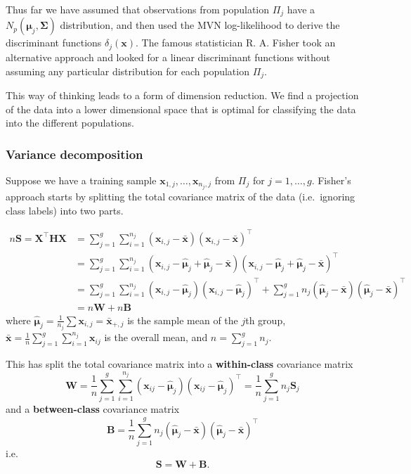 \documentclass[
]{book}
\theoremstyle{definition}
\theoremstyle{definition}
\theoremstyle{definition}
\theoremstyle{definition}
\theoremstyle{remark}
\begin{document}
Thus far we have assumed that observations from population \(\Pi_j\) have a \(N_p ( \boldsymbol{\mu}_j, {\mathbf \Sigma})\) distribution, and then used the MVN log-likelihood to derive the discriminant functions \(\delta_j(\mathbf x)\). The famous statistician R. A. Fisher took an alternative approach and looked for a linear discriminant functions without assuming any particular distribution for each population \(\Pi_j\).

This way of thinking leads to a form of dimension reduction. We find a projection of the data into a lower dimensional space that is optimal for classifying the data into the different populations.

\subsubsection*{Variance decomposition}\label{variance-decomposition}

Suppose we have a training sample \(\mathbf x_{1,j}, \ldots, \mathbf x_{n_j,j}\) from \(\Pi_j\) for \(j=1,\ldots,g\).
Fisher's approach starts by splitting the total covariance matrix of the data (i.e.~ignoring class labels) into two parts.

\begin{align*}
n\mathbf S=\mathbf X^\top\mathbf H\mathbf X&= \sum_{j=1}^g\sum_{i=1}^{n_j} (\mathbf x_{i,j} - \bar{\mathbf x})(\mathbf x_{i,j} - \bar{\mathbf x})^\top\\
&=\sum_{j=1}^g\sum_{i=1}^{n_j} (\mathbf x_{i,j} - \hat{{\boldsymbol{\mu}}}_j+\hat{{\boldsymbol{\mu}}}_j-\bar{\mathbf x})(\mathbf x_{i,j} - \hat{{\boldsymbol{\mu}}}_j+\hat{{\boldsymbol{\mu}}}_j-\bar{\mathbf x})^\top\\
&= \sum_{j=1}^g\sum_{i=1}^{n_j} (\mathbf x_{i,j} - \hat{{\boldsymbol{\mu}}}_j)(\mathbf x_{i,j} - \hat{{\boldsymbol{\mu}}}_j)^\top+
\sum_{j=1}^g n_j (\hat{{\boldsymbol{\mu}}}_j-\bar{\mathbf x})(\hat{{\boldsymbol{\mu}}}_j-\bar{\mathbf x})^\top\\
&=n\mathbf W+n\mathbf B
\end{align*}
where \(\hat{{\boldsymbol{\mu}}}_j=\frac{1}{n_j} \sum \mathbf x_{i,j} = \bar{\mathbf x}_{+,j}\) is the sample mean of the \(j\)th group, \(\bar{\mathbf x} = \frac{1}{n} \sum_{j=1}^g \sum_{i=1}^{n_j}
\mathbf x_{ij}\) is the overall mean, and \(n=\sum_{j=1}^g n_j\).

This has split the total covariance matrix into a \textbf{within-class} covariance matrix
\[ \mathbf W= \frac{1}{n}\sum_{j=1}^g \sum_{i=1}^{n_j} (\mathbf x_{ij} - \hat{{\boldsymbol{\mu}}}_j) (\mathbf x_{ij} - \hat{{\boldsymbol{\mu}}}_j)^\top  = \frac{1}{n}\sum_{j=1}^g n_j \mathbf S_j \]
and a \textbf{between-class} covariance matrix
\[ \mathbf B= \frac{1}{n}\sum_{j=1}^g n_j (\hat{{\boldsymbol{\mu}}}_j - \bar{\mathbf x}) (\hat{{\boldsymbol{\mu}}}_j - \bar{\mathbf x})^\top\]
i.e.
\[\mathbf S= \mathbf W+ \mathbf B.\]
\end{document}
